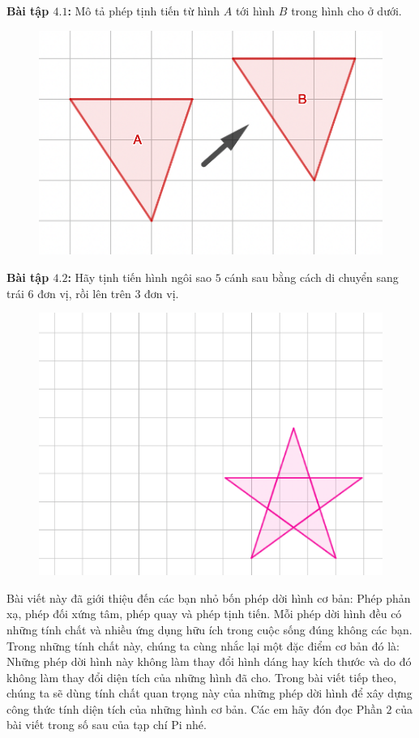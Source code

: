 \begin{multicols}{2}
\begin{figure}[H]
		\vspace*{-10pt}
	\end{figure}
	\textbf{\color{toancuabi}Bài tập $\pmb{4.1}$:} Mô tả phép tịnh tiến từ hình $A$ tới hình $B$ trong hình cho ở dưới.
	\begin{figure}[H]
		\vspace*{-5pt}
		\centering
		\captionsetup{labelformat= empty, justification=centering}
		\includegraphics[width= 0.65\linewidth]{Picture38}
		\vspace*{-10pt}
	\end{figure}
	\textbf{\color{toancuabi}Bài tập $\pmb{4.2}$:} Hãy tịnh tiến hình ngôi sao $5$ cánh sau bằng cách di chuyển sang trái $6$ đơn vị, rồi lên trên $3$ đơn vị.
	\begin{figure}[H]
		\vspace*{-5pt}
		\centering
		\captionsetup{labelformat= empty, justification=centering}
		\includegraphics[width= 1\linewidth]{Picture39}
		\vspace*{-10pt}
	\end{figure}
	Bài viết này đã giới thiệu đến các bạn nhỏ bốn phép dời hình cơ bản: Phép phản xạ, phép đối xứng tâm, phép quay và phép tịnh tiến. Mỗi phép dời hình đều có những tính chất và nhiều ứng dụng hữu ích trong cuộc sống đúng không các bạn. Trong những tính chất này, chúng ta cùng nhắc lại một đặc điểm cơ bản đó là: Những phép dời hình này không làm thay đổi hình dáng hay kích thước và do đó không làm thay đổi diện tích của những hình đã cho. Trong bài viết tiếp theo, chúng ta sẽ dùng tính chất quan trọng này của những phép dời hình để xây dựng công thức tính diện tích của những hình cơ bản. Các em hãy đón đọc Phần $2$ của bài viết trong số sau của tạp chí Pi nhé.
\end{multicols}
